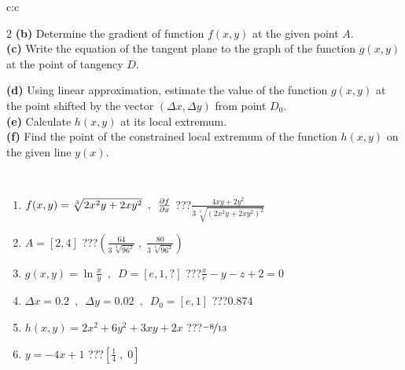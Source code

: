 \documentclass[10pt]{report}
\begin{document}
\begin{tabular}{c:c}
\begin{minipage}[c][104.5mm][t]{0.5\linewidth}
\begin{center}
\begin{minipage}{0.95\linewidth}
\begin{center}
{\begin{multicols}{2}
\textbf{(b)} Determine the gradient of function \(f(x,y)\) at the given point \(A\). \\[1mm]
\textbf{(c)} Write the equation of the tangent plane to the graph of the function \(g(x,y)\) at the point of tangency \(D\). \par \columnbreak
\textbf{(d)} Using linear approximation, estimate the value of the function \(g(x,y)\) at the point shifted by the vector \((\Delta x, \Delta y)\) from point \(D_0\). \\[1mm]
\textbf{(e)} Calculate \(h(x,y)\) at its local extremum. \\[1mm]
\textbf{(f)} Find the point of the constrained local extremum of the function \(h(x,y)\) on the given line \(y(x)\). \\[1mm]
\end{multicols}
}
\end{center}
\end{minipage}
\\[4mm]
\begin{minipage}{0.79\linewidth}
\begin{center}
\begin{varwidth}{\linewidth}
\begin{enumerate}
\normalsizerr
\item $f(x,y) = \sqrt[3]{2x^2y + 2xy^2}\enspace , \enspace \pdv{f}{x}$\quad \dotfill\; ???\;\dotfill \quad $\frac{4xy+2y^2}{3\,\sqrt[3]{(2x^2y+2xy^2)^{2}}}$
\item $A = [2, 4]$\quad \dotfill\; ???\;\dotfill \quad $\left( \frac{64}{3\,\sqrt[3]{96^2}} \;,\; \frac{80}{3\,\sqrt[3]{96^2}} \right)$
\item $g(x,y) = \ln\frac{x}{y} \enspace , \enspace D=[e,1,?]$\quad \dotfill\; ???\;\dotfill \quad $\frac{x}{e} - y - z + 2 = 0$
\item $\Delta x = {0.2} \enspace,\enspace \Delta y = {0.02} \enspace,\enspace D_0 = [e,1]$\quad \dotfill\; ???\;\dotfill \quad $0.874$
\item $h(x,y) = 2x^2+6y^2+3xy+2x$\quad \dotfill\; ???\;\dotfill \quad $\nicefrac{-8}{13}$
\item $y = -4x+1$\quad \dotfill\; ???\;\dotfill \quad $\left[\frac{1}{4}\;,\;0\right]$
\end{enumerate}
\end{varwidth}
\end{center}
\end{minipage}
\begin{minipage}{0.20\linewidth}
\begin{center}

\end{center}
\end{minipage}
\end{center}
\end{minipage}
\end{tabular}
\end{document}

